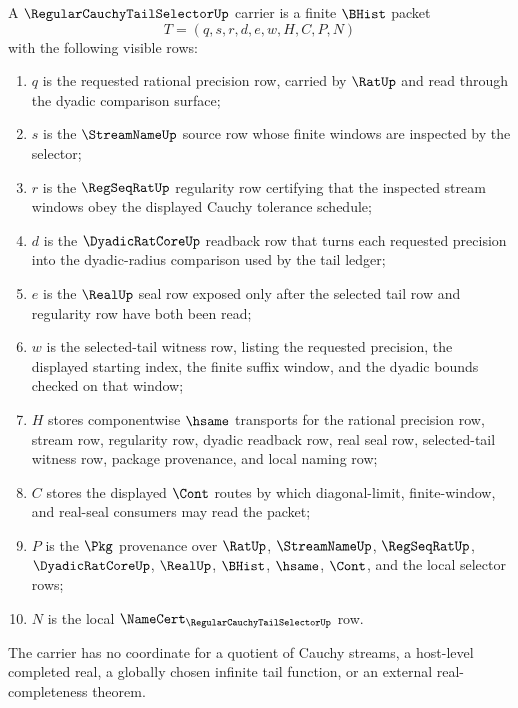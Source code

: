 \begin{definition}
\label{def:regular-cauchy-tail-selector-carrier}
\label{def:reg-cauchy-tail-sel-carrier}
A $\RegularCauchyTailSelectorUp$ carrier is a finite $\BHist$ packet
$$
T=(q,s,r,d,e,w,H,C,P,N)
$$
with the following visible rows:
\begin{enumerate}
\item $q$ is the requested rational precision row, carried by $\RatUp$ and read through the dyadic comparison surface;
\item $s$ is the $\StreamNameUp$ source row whose finite windows are inspected by the selector;
\item $r$ is the $\RegSeqRatUp$ regularity row certifying that the inspected stream windows obey the displayed Cauchy tolerance schedule;
\item $d$ is the $\DyadicRatCoreUp$ readback row that turns each requested precision into the dyadic-radius comparison used by the tail ledger;
\item $e$ is the $\RealUp$ seal row exposed only after the selected tail row and regularity row have both been read;
\item $w$ is the selected-tail witness row, listing the requested precision, the displayed starting index, the finite suffix window, and the dyadic bounds checked on that window;
\item $H$ stores componentwise $\hsame$ transports for the rational precision row, stream row, regularity row, dyadic readback row, real seal row, selected-tail witness row, package provenance, and local naming row;
\item $C$ stores the displayed $\Cont$ routes by which diagonal-limit, finite-window, and real-seal consumers may read the packet;
\item $P$ is the $\Pkg$ provenance over $\RatUp$, $\StreamNameUp$, $\RegSeqRatUp$, $\DyadicRatCoreUp$, $\RealUp$, $\BHist$, $\hsame$, $\Cont$, and the local selector rows;
\item $N$ is the local $\NameCert_{\RegularCauchyTailSelectorUp}$ row.
\end{enumerate}
The carrier has no coordinate for a quotient of Cauchy streams, a host-level completed real, a globally chosen infinite tail function, or an external real-completeness theorem.
\end{definition}

